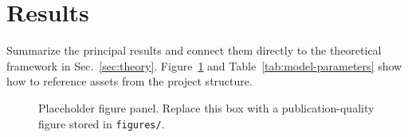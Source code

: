 \section{Results}
\label{sec:results}

Summarize the principal results and connect them directly to the theoretical framework in Sec.~\ref{sec:theory}.
Figure~\ref{fig:placeholder} and Table~\ref{tab:model-parameters} show how to reference assets from the project structure.

\begin{figure}[t]
  \centering
  
  \caption{Placeholder figure panel. Replace this box with a publication-quality figure stored in \texttt{figures/}.}
  \label{fig:placeholder}
\end{figure}


